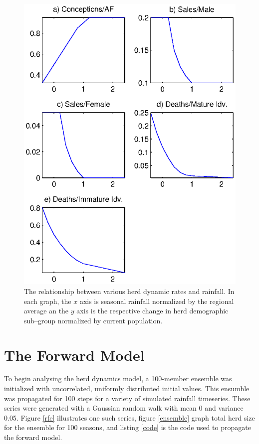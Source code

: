 \documentclass[letterpaper]{tufte-handout}
\begin{document}
\begin{figure}
\includegraphics[width=\textwidth]{refrel}
\caption{The relationship between various herd dynamic rates and rainfall. In each graph, the $x$ axis is seasonal rainfall normalized by the regional average an the $y$ axis is the respective change in herd demographic sub--group normalized by current population.}
\label{rferels}
\end{figure}

\section{The Forward Model}

To begin analysing the herd dynamics model, a 100-member ensemble was initialized with uncorrelated, uniformly distributed initial values. This ensumble was propagated for 100 steps for a variety of simulated rainfall timeseries. These series were generated with a Gaussian random walk with mean 0 and variance 0.05. Figure \ref{rfe} illustrates one such series, figure \ref{ensemble} graph total herd size for the ensemble for 100 seasons, and listing \ref{code} is the code used to propagate the forward model.
\end{document}
